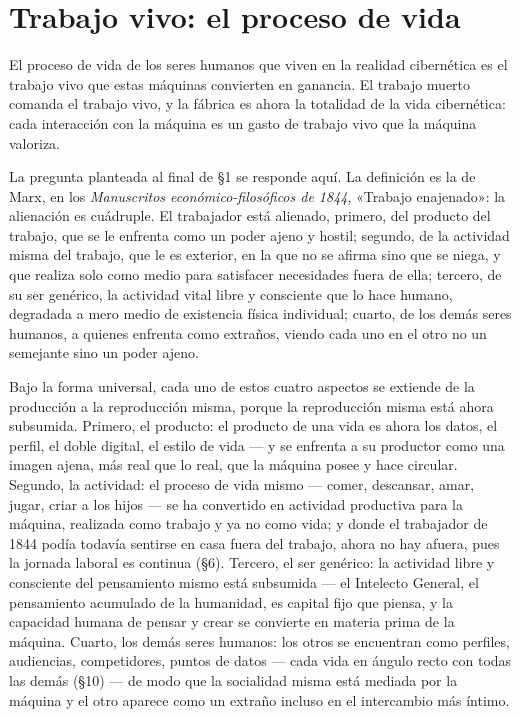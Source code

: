 \documentclass[11pt]{article}
\begin{document}
\section{Trabajo vivo: el proceso de vida}

El proceso de vida de los seres humanos que viven en la realidad
cibernética es el trabajo vivo que estas máquinas convierten en ganancia.
El trabajo muerto comanda el trabajo vivo, y la fábrica es ahora la
totalidad de la vida cibernética: cada interacción con la máquina es un
gasto de trabajo vivo que la máquina valoriza.

La pregunta planteada al final de §1 se responde aquí. La definición
es la de Marx, en los \textit{Manuscritos económico-filosóficos de
1844}, «Trabajo enajenado»: la alienación es cuádruple. El trabajador
está alienado, primero, del producto del trabajo, que se le enfrenta
como un poder ajeno y hostil; segundo, de la actividad misma del
trabajo, que le es exterior, en la que no se afirma sino que se niega,
y que realiza solo como medio para satisfacer necesidades fuera de ella;
tercero, de su ser genérico, la actividad vital libre y consciente que
lo hace humano, degradada a mero medio de existencia física individual;
cuarto, de los demás seres humanos, a quienes enfrenta como extraños,
viendo cada uno en el otro no un semejante sino un poder ajeno.

Bajo la forma universal, cada uno de estos cuatro aspectos se extiende
de la producción a la reproducción misma, porque la reproducción misma
está ahora subsumida. Primero, el producto: el producto de una vida es
ahora los datos, el perfil, el doble digital, el estilo de vida --- y se
enfrenta a su productor como una imagen ajena, más real que lo real, que
la máquina posee y hace circular. Segundo, la actividad: el proceso de
vida mismo --- comer, descansar, amar, jugar, criar a los hijos --- se
ha convertido en actividad productiva para la máquina, realizada como
trabajo y ya no como vida; y donde el trabajador de 1844 podía todavía
sentirse en casa fuera del trabajo, ahora no hay afuera, pues la jornada
laboral es continua (§6). Tercero, el ser genérico: la actividad libre y
consciente del pensamiento mismo está subsumida --- el Intelecto
General, el pensamiento acumulado de la humanidad, es capital fijo que
piensa, y la capacidad humana de pensar y crear se convierte en materia
prima de la máquina. Cuarto, los demás seres humanos: los otros se
encuentran como perfiles, audiencias, competidores, puntos de datos ---
cada vida en ángulo recto con todas las demás (§10) --- de modo que la
socialidad misma está mediada por la máquina y el otro aparece como un
extraño incluso en el intercambio más íntimo.
\end{document}
